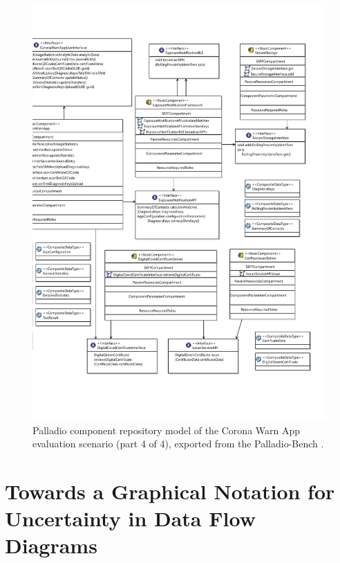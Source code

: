 \begin{figure}
    \centering
    \includegraphics[width=\textwidth]{figures/chapter12/cwa4.pdf}
    \caption[Palladio component repository model of the Corona Warn App evaluation scenario (part 4 of 4).]{Palladio component repository model of the Corona Warn App evaluation scenario (part 4 of 4), exported from the Palladio-Bench \cite{reussner_palladio_2024}.}
    \label{fig:appendix:cwa:4}
\end{figure}





\chapter{Towards a Graphical Notation for Uncertainty in Data Flow Diagrams}%
\label{sec:appendix:ndfd}

